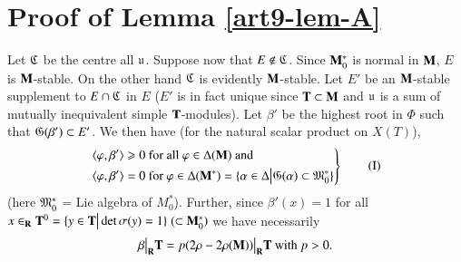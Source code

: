 \section{Proof of Lemma \ref{art9-lem-A}}%
Let $\mathfrak{C}$ be the centre all $\mathfrak{u}$. Suppose now that $E \not\in \mathfrak{C}$. Since $\mathbf{M}^\ast_0$ is normal in $\mathbf{M}$, $E$ is $\mathbf{M}$-stable. On the other hand $\mathfrak{C}$ is evidently $\mathbf{M}$-stable. Let $E'$ be an $\mathbf{M}$-stable supplement to $E \cap \mathfrak{C}$ in $E$ ($E'$ is in fact unique since $\mathbf{T} \subset \mathbf{M}$ and $\mathfrak{u}$ is a sum of mutually inequivalent simple $\mathbf{T}$-modules). Let $\beta'$ be the highest root in $\Phi$ such that $\mathfrak{G} (\beta') \subset E'$. We then have (for the natural scalar product on $X(T)$),
\begin{equation*}
\left.
\begin{aligned}
& \langle \varphi, \beta' \rangle  \geqslant 0 \text{ for all  } \varphi \in \Delta (\mathbf{M}) \text{ and }\\
& \langle \varphi, \beta' \rangle = 0 \text{ for } \varphi \in \Delta (\mathbf{M}^\ast) = \{\alpha \in \Delta \big| \mathfrak{G} (\alpha) \subset \mathfrak{M}^\ast_0\} 
\end{aligned}
\right\}
\tag{I} 
\end{equation*}
(here $\mathfrak{M}^\ast_0$ = Lie algebra of $M^\ast_0$). Further, since $\beta'(x) =1$ for all $x \in_{\mathbf{R}} \mathbf{T}^0 = \{y \in \mathbf{T} \big| \det \sigma(y) =1\} \; (\subset \mathbf{M}^\ast_0)$ we have necessarily
$$
\beta \big|_{\mathbf{R}} \mathbf{T} = p (2\rho -2 \rho (\mathbf{M})) \big|_{\mathbf{R}} \mathbf{T} \text{ with } p > 0.
$$

